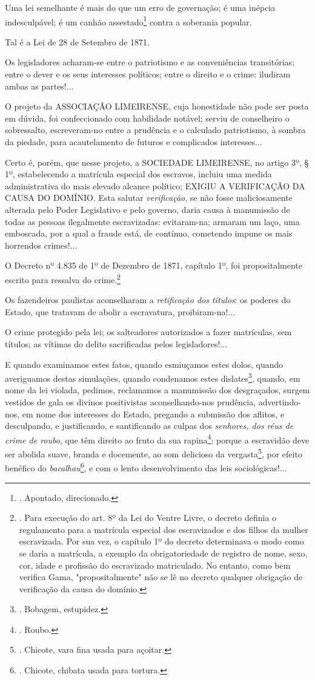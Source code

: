 Uma lei semelhante é mais do que um erro de governação; é uma inépcia
indesculpável; é um canhão assestado\footnote{. Apontado, direcionado.}
contra a soberania popular.

Tal é a Lei de 28 de Setembro de 1871.

Os legisladores acharam-se entre o patriotismo e as conveniências
transitórias; entre o dever e os seus interesses políticos; entre o
direito e o crime: iludiram ambas as partes!...

O projeto da ASSOCIAÇÃO LIMEIRENSE, cuja honestidade não pode ser posta
em dúvida, foi confeccionado com habilidade notável; serviu de
conselheiro o sobressalto, escreveram-no entre a prudência e o calculado
patriotismo, à sombra da piedade, para acautelamento de futuros e
complicados interesses...

Certo é, porém, que nesse projeto, a SOCIEDADE LIMEIRENSE, no artigo 3º,
§ 1º, estabelecendo a matrícula especial dos escravos, incluiu uma
medida administrativa do mais elevado alcance político; EXIGIU A
VERIFICAÇÃO DA CAUSA DO DOMÍNIO. Esta salutar \emph{verificação}, se não
fosse maliciosamente alterada pelo Poder Legislativo e pelo governo,
daria causa à manumissão de todas as pessoas ilegalmente escravizadas:
evitaram-na; armaram um laço, uma emboscada, por a qual a fraude está,
de contínuo, cometendo impune os mais horrendos crimes!...

O Decreto nº 4.835 de 1º de Dezembro de 1871, capítulo 1º, foi
propositalmente escrito para ressalva do crime.\footnote{. Para execução
  do art. 8º da Lei do Ventre Livre, o decreto definia o regulamento
  para a matrícula especial dos escravizados e dos filhos da mulher
  escravizada. Por sua vez, o capítulo 1º do decreto determinava o modo
  como se daria a matrícula, a exemplo da obrigatoriedade de registro de
  nome, sexo, cor, idade e profissão do escravizado matriculado. No
  entanto, como bem verifica Gama, "propositalmente" não se lê no
  decreto qualquer obrigação de verificação da causa do domínio.}

Os fazendeiros paulistas aconselharam a \emph{retificação dos títulos}:
os poderes do Estado, que tratavam de abolir a escravatura,
proibiram-na!...

O crime protegido pela lei; os salteadores autorizados a fazer
matrículas, sem títulos; as vítimas do delito sacrificadas pelos
legisladores!...

E quando examinamos estes fatos, quando esmiuçamos estes dolos, quando
averiguamos destas simulações, quando condenamos estes
dislates\footnote{. Bobagem, estupidez.}, quando, em nome da lei
violada, pedimos, reclamamos a manumissão dos desgraçados, surgem
vestidos de gala os divinos positivistas aconselhando-nos prudência,
advertindo-nos, em nome dos interesses do Estado, pregando a submissão
dos aflitos, e desculpando, e justificando, e santificando as culpas dos
\emph{senhores, dos réus de crime de roubo}, que têm direito ao fruto da
sua rapina\footnote{. Roubo.}; porque a escravidão deve ser abolida
suave, branda e docemente, ao som delicioso da vergasta\footnote{.
  Chicote, vara fina usada para açoitar.}, por efeito benéfico do
\emph{bacalhau}\footnote{. Chicote, chibata usada para tortura.},
e com o lento
desenvolvimento das leis sociológicas!...


